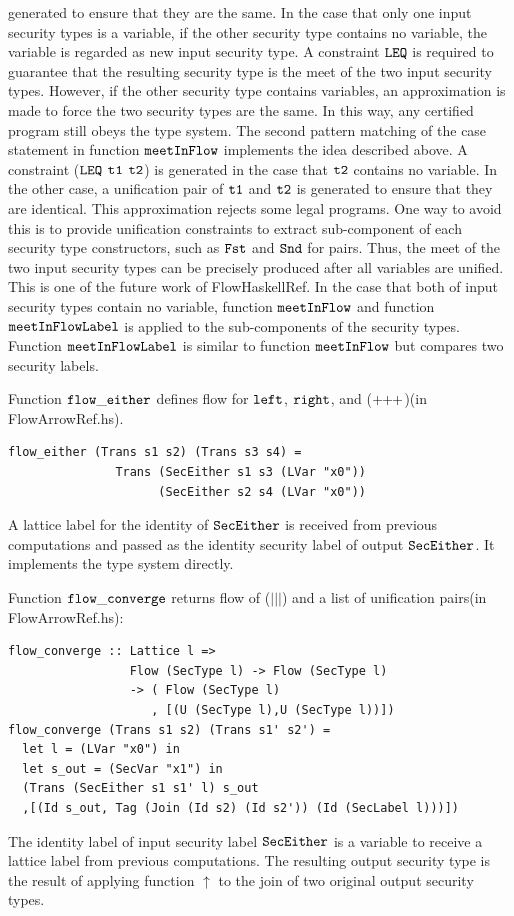 \documentclass{report}
\newcommand{\arrowop}[1]{$#1\negthickspace #1\negthickspace #1$}
\newcommand{\co}[1]{$\cod{#1}$}
\newcommand{\tagup}{\uparrow}
\begin{document}
generated to ensure that they are the same.
In the case that only one input security types is a variable, if the other security type contains no variable,
the variable is regarded as new input security type. A constraint \co{LEQ} is required to guarantee that the 
resulting security type is the meet of the two input security types. 
However, if the other security type contains variables, an approximation is made to force the two security
types are the same. In this way, any certified program still obeys the type system. 
The second pattern matching of the case statement in function \co{meetInFlow} implements the idea described above.
A constraint (\co{LEQ} \co{t1} \co{t2}) is generated in the case that \co{t2} contains no variable.
In the other case, a unification pair of \co{t1} and \co{t2} is generated to ensure that they are identical.
This approximation rejects some legal programs. One way to avoid this is to provide unification 
constraints to extract sub-component of each security type constructors, such as \co{Fst} and \co{Snd} for pairs.
Thus, the meet of the two input security types can be precisely
produced after all variables are unified. This is one of the future work of FlowHaskellRef.
In the case that both of input security types contain no variable, function \co{meetInFlow} and 
function \co{meetInFlowLabel} is applied to the sub-components of the security types.
Function \co{meetInFlowLabel} is similar to function \co{meetInFlow} but compares two security labels.

Function \co{flow\_either} defines
flow for \co{left}, \co{right}, and (\arrowop{+})(in FlowArrowRef.hs).
\begin{Verbatim}[fontsize=\small]
flow_either (Trans s1 s2) (Trans s3 s4) = 
               Trans (SecEither s1 s3 (LVar "x0")) 
                     (SecEither s2 s4 (LVar "x0"))
\end{Verbatim}
A lattice label for the identity of \co{SecEither} is received from previous computations and passed
as the identity security label of output \co{SecEither}. It implements the type system directly.

Function \co{flow\_converge} returns flow of ($|||$) and a list of unification
pairs(in FlowArrowRef.hs):
\begin{Verbatim}[fontsize=\small]
flow_converge :: Lattice l => 
                 Flow (SecType l) -> Flow (SecType l)
                 -> ( Flow (SecType l)
                    , [(U (SecType l),U (SecType l))])
flow_converge (Trans s1 s2) (Trans s1' s2') =
  let l = (LVar "x0") in
  let s_out = (SecVar "x1") in
  (Trans (SecEither s1 s1' l) s_out
  ,[(Id s_out, Tag (Join (Id s2) (Id s2')) (Id (SecLabel l)))])
\end{Verbatim}
The identity label of input security label \co{SecEither} is a variable to receive a lattice label
from previous computations.
The resulting output security type is the result of applying function $\tagup$ to the join of 
two original output security types.
\end{document}
